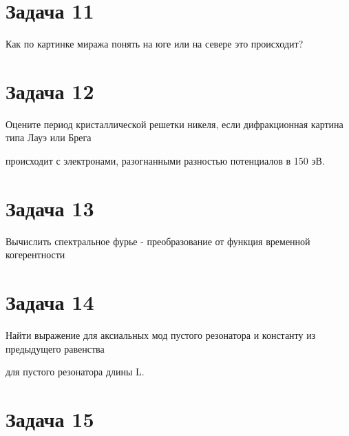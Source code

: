 \documentclass[14pt,a4paper]{article}
\begin{document}
    \par 

\section*{Задача 11}
    
    \par \textsf{Как по картинке миража понять на юге или на севере это происходит?}\\
    
    \par 

\section*{Задача 12}
    
    \par \textsf{Оцените период кристаллической решетки никеля, если дифракционная картина типа Лауэ или Брега}\\
    \par \textsf{происходит с электронами, разогнанными разностью потенциалов в 150 эВ.}\\
    
    \par 

\section*{Задача 13}
    
    \par \textsf{Вычислить спектральное фурье - преобразование от функция временной когерентности}\\
    
    \par 

\section*{Задача 14}
    
    \par \textsf{Найти выражение для аксиальных мод пустого резонатора и константу из предыдущего равенства}\\
    \par \textsf{для пустого резонатора длины L.}\\
    
    \par 

\section*{Задача 15}
    
\end{document}
